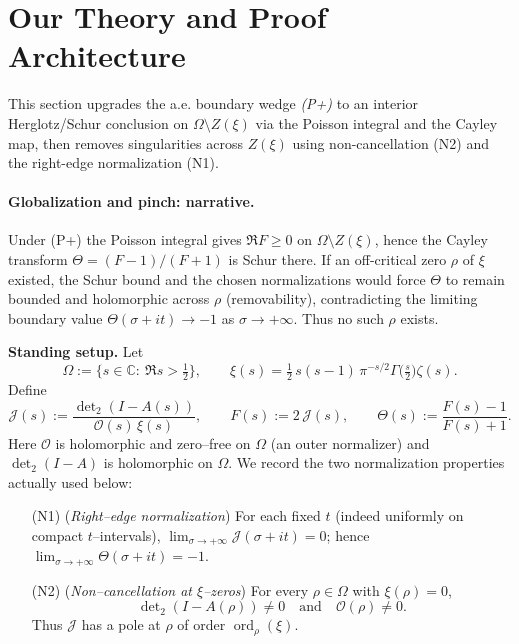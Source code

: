 \documentclass[11pt]{article}
\theoremstyle{definition}
\theoremstyle{remark}
\begin{document}
\vspace{1.0cm}
\section{Our Theory and Proof Architecture}
\label{sec:theory} %
\noindent This section upgrades the a.e. boundary wedge \emph{(P+)} to an interior Herglotz/Schur conclusion
on $\Omega\setminus Z(\xi)$ via the Poisson integral and the Cayley map, then removes singularities
across $Z(\xi)$ using non-cancellation \textnormal{(N2)} and the right-edge normalization \textnormal{(N1)}.


\vspace{1.0cm}
\paragraph{Globalization and pinch: narrative.}
Under (P+) the Poisson integral gives $\Re F\ge 0$ on $\Omega\setminus Z(\xi)$, hence
the Cayley transform $\Theta=(F-1)/(F+1)$ is Schur there.
If an off-critical zero $\rho$ of $\xi$ existed, the Schur bound and the chosen normalizations would
force $\Theta$ to remain bounded and holomorphic across $\rho$ (removability),
contradicting the limiting boundary value $\Theta(\sigma+it)\to-1$ as $\sigma\to+\infty$.
Thus no such $\rho$ exists.


\textbf{Standing setup.}
Let
\[
\Omega:=\{s\in\mathbb C:\ \Re s>\tfrac12\},\qquad
\xi(s)=\tfrac12\,s(s-1)\,\pi^{-s/2}\Gamma\!\big(\tfrac s2\big)\zeta(s).
\]
Define
\[
\mathcal J(s):=\frac{\det\nolimits_2(I-A(s))}{\mathcal O(s)\,\xi(s)},\qquad
F(s):=2\,\mathcal J(s),\qquad
\Theta(s):=\frac{F(s)-1}{F(s)+1}.
\]
Here $\mathcal O$ is holomorphic and zero--free on $\Omega$ (an outer normalizer) and
$\det\nolimits_2(I-A)$ is holomorphic on $\Omega$.
We record the two normalization properties actually used below:
\begin{itemize}
\item[(N1)] (\emph{Right--edge normalization})
  For each fixed $t$ (indeed uniformly on compact $t$–intervals),
  $\displaystyle\lim_{\sigma\to+\infty}\mathcal J(\sigma+it)=0$; hence $\displaystyle\lim_{\sigma\to+\infty}\Theta(\sigma+it)=-1$.
\item[(N2)] (\emph{Non--cancellation at $\xi$--zeros}) For every $\rho\in\Omega$ with $\xi(\rho)=0$,
\[
\det\nolimits_2(I-A(\rho))\neq0\quad\text{and}\quad \mathcal O(\rho)\neq0.
\]
Thus $\mathcal J$ has a pole at $\rho$ of order $\operatorname{ord}_\rho(\xi)$.
\end{itemize}
\end{document}

